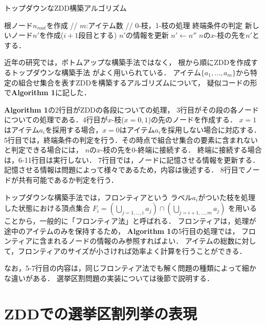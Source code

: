 \begin{algorithm}
  \caption{トップダウンなZDD構築アルゴリズム}
  \label{zdd_topdown}
  \begin{algorithmic}[1]
    \State 根ノード$n_{root}$を作成
     // $m$:アイテム数
       // 0-枝，1-枝の処理
        \State 終端条件の判定
        \State 新しいノード$n'$を作成($i+1$段目とする)
        \State $n'$の情報を更新
          \State $n' \gets n''$
        \EndIf
        \State $n$の$x$-枝の先を$n'$とする．
        \EndFor
      \EndFor
    \EndFor
  \end{algorithmic}
\end{algorithm}

近年の研究では，ボトムアップな構築手法ではなく，
根から順にZDDを作成するトップダウンな構築手法\cite{minato_or}\cite{sekine}
がよく用いられている．
アイテム$\{a_1,\ldots	,a_m\}$から特定の組合せ集合を表すZDDを構築するアルゴリズムについて，
疑似コードの形で\textbf{Algorithm 1}に記した．

\textbf{Algorithm 1}の2行目がZDDの各段についての処理，
3行目がその段の各ノードについての処理である．4行目が$x$-枝($x=0,1$)の先のノードを作成する．
$x=1$はアイテム$a_i$を採用する場合，$x=0$はアイテム$a_i$を採用しない場合に対応する．
5行目では，終端条件の判定を行う．その時点で組合せ集合の要素に含まれないと判定できる場合には，
$n$の$x$-枝の先を0-終端に接続する．
終端に接続する場合は，6-11行目は実行しない．
7行目では，ノードに記憶させる情報を更新する．
記憶させる情報は問題によって様々であるため，内容は後述する．
8行目でノードが共有可能であるか判定を行う．

トップダウンな構築手法では，フロンティアという
ラベル$a_i$がついた枝を処理した状態における頂点集合
$F_i=(\bigcup_{j=1,\ldots ,i}a_j)\cap (\bigcup_{j=i+1, \ldots, m} a_j)$
を用いることから，一般的に「フロンティア法」と呼ばれる．
フロンティアは，処理が途中のアイテムのみを保持するため，
\textbf{Algorithm 1}の5行目の処理では，
フロンティアに含まれるノードの情報のみ参照すればよい．
アイテムの総数に対して，フロンティアのサイズが小さければ効率よく計算を行うことができる．

なお，5-7行目の内容は，同じフロンティア法でも解く問題の種類によって細かな違いがある．
選挙区割問題の実装については後節で説明する．

\section{ZDDでの選挙区割列挙の表現}


